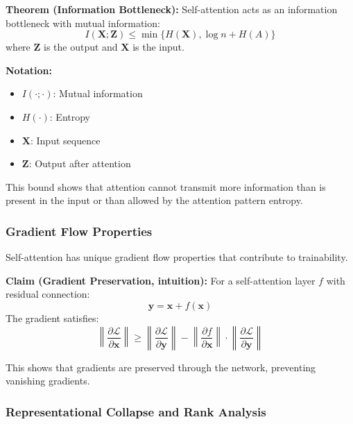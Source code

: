 \documentclass[11pt]{article}
\begin{document}
\textbf{Theorem (Information Bottleneck):} Self-attention acts as an information bottleneck with mutual information:
\begin{equation}
I(\mathbf{X}; \mathbf{Z}) \leq \min\{H(\mathbf{X}), \log n + H(A)\}
\end{equation}
where $\mathbf{Z}$ is the output and $\mathbf{X}$ is the input.

\begin{notationbox}
\textbf{Notation:}
\begin{itemize}
    \item $I(\cdot; \cdot)$: Mutual information
    \item $H(\cdot)$: Entropy
    \item $\mathbf{X}$: Input sequence
    \item $\mathbf{Z}$: Output after attention
\end{itemize}
\end{notationbox}

This bound shows that attention cannot transmit more information than is present in the input or than allowed by the attention pattern entropy.

\subsubsection{Gradient Flow Properties}

Self-attention has unique gradient flow properties that contribute to trainability.

\textbf{Claim (Gradient Preservation, intuition):} For a self-attention layer $f$ with residual connection:
\begin{equation}
\mathbf{y} = \mathbf{x} + f(\mathbf{x})
\end{equation}
The gradient satisfies:
\begin{equation}
\left\|\frac{\partial \mathcal{L}}{\partial \mathbf{x}}\right\| \geq \left\|\frac{\partial \mathcal{L}}{\partial \mathbf{y}}\right\| - \left\|\frac{\partial f}{\partial \mathbf{x}}\right\| \cdot \left\|\frac{\partial \mathcal{L}}{\partial \mathbf{y}}\right\|
\end{equation}

This shows that gradients are preserved through the network, preventing vanishing gradients.

\subsubsection{Representational Collapse and Rank Analysis}
\end{document}
